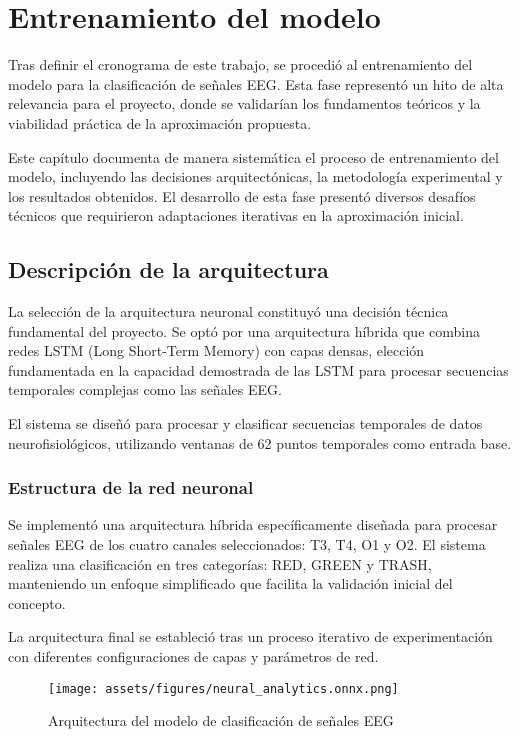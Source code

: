 \chapter{Entrenamiento del modelo}\label{ch:model_training}

Tras definir el cronograma de este trabajo, se procedió al entrenamiento del modelo para la clasificación de señales EEG. Esta fase representó un hito de alta relevancia para el proyecto, donde se validarían los fundamentos teóricos y la viabilidad práctica de la aproximación propuesta.

Este capítulo documenta de manera sistemática el proceso de entrenamiento del modelo, incluyendo las decisiones arquitectónicas, la metodología experimental y los resultados obtenidos. El desarrollo de esta fase presentó diversos desafíos técnicos que requirieron adaptaciones iterativas en la aproximación inicial.

\section{Descripción de la arquitectura}

La selección de la arquitectura neuronal constituyó una decisión técnica fundamental del proyecto. Se optó por una arquitectura híbrida que combina redes LSTM (Long Short-Term Memory) con capas densas, elección fundamentada en la capacidad demostrada de las LSTM para procesar secuencias temporales complejas como las señales EEG.

El sistema se diseñó para procesar y clasificar secuencias temporales de datos neurofisiológicos, utilizando ventanas de 62 puntos temporales como entrada base.

\subsection{Estructura de la red neuronal}

Se implementó una arquitectura híbrida específicamente diseñada para procesar señales EEG de los cuatro canales seleccionados: T3, T4, O1 y O2. El sistema realiza una clasificación en tres categorías: RED, GREEN y TRASH, manteniendo un enfoque simplificado que facilita la validación inicial del concepto.

La arquitectura final se estableció tras un proceso iterativo de experimentación con diferentes configuraciones de capas y parámetros de red.

\begin{figure}[ht]
    \centering
    \texttt{[image: assets/figures/neural\_analytics.onnx.png]}
    \caption{Arquitectura del modelo de clasificación de señales EEG}
    \label{fig:model_architecture}
\end{figure}

